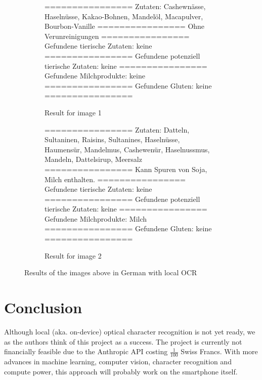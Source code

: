 \documentclass[a4paper,11pt]{report}
\begin{document}
            \begin{figure}[h]
                \centering
                \begin{subfigure}{0.45\textwidth}
                    \centering
                    ================
                    Zutaten: Cashewnässe, Haselnüsse, Kakao-Bohnen, Mandelöl, Macapulver, Bourbon-Vanille
                    ================
                    Ohne Verunreinigungen
                    ================
                    Gefundene tierische Zutaten: keine
                    ================
                    Gefundene potenziell tierische Zutaten: keine
                    ================
                    Gefundene Milchprodukte: keine
                    ================
                    Gefundene Gluten: keine
                    ================
                    \caption{Result for image 1}
                    \label{fig:text2_test_image_1}
                \end{subfigure}
                \hfill
                \begin{subfigure}{0.45\textwidth}
                    \centering
                    ================
                    Zutaten: Datteln, Sultaninen, Raisins, Sultanines, Haselnüsse, Haumensür, Mandelmus, Cashewenür, Haselnussmus, Mandeln, Dattelsirup, Meersalz
                    ================
                    Kann Spuren von Soja, Milch enthalten.
                    ================
                    Gefundene tierische Zutaten: keine
                    ================
                    Gefundene potenziell tierische Zutaten: keine
                    ================
                    Gefundene Milchprodukte: Milch
                    ================
                    Gefundene Gluten: keine
                    ================
                    \caption{Result for image 2}
                    \label{fig:text2_test_image_2}
                \end{subfigure}
                \caption{Results of the images above in German with local OCR}
                \label{fig:subsection-test-text2}
            \end{figure}
            \FloatBarrier
        
        \section{Conclusion}
            Although local (aka. on-device) optical character recognition is not yet ready, we as the authors think of this project as a success. The project is currently not financially feasible due to the Anthropic API costing $\frac{1}{100}$ Swiss Francs. With more advances in machine learning, computer vision, character recognition and compute power, this approach will probably work on the smartphone itself.
            
\end{document}

